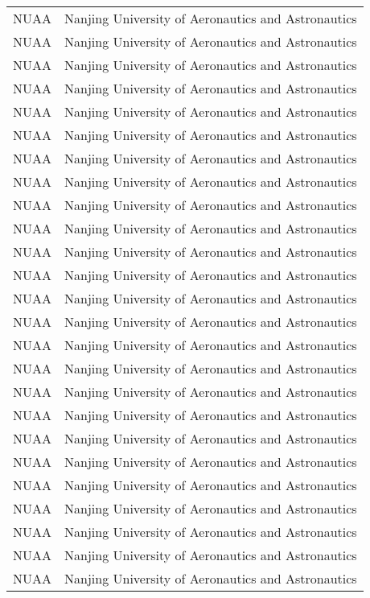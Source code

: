 \begin{longtable}{>{\centering\arraybackslash}p{3cm}>{\centering\arraybackslash}X}
		NUAA	& Nanjing University of Aeronautics and Astronautics \\ 
		NUAA	& Nanjing University of Aeronautics and Astronautics \\
		NUAA	& Nanjing University of Aeronautics and Astronautics \\ 
		NUAA	& Nanjing University of Aeronautics and Astronautics \\ 
		NUAA	& Nanjing University of Aeronautics and Astronautics \\ 
		NUAA	& Nanjing University of Aeronautics and Astronautics \\ 
		NUAA	& Nanjing University of Aeronautics and Astronautics \\ 
		NUAA	& Nanjing University of Aeronautics and Astronautics \\ 
		NUAA	& Nanjing University of Aeronautics and Astronautics \\ 
		NUAA	& Nanjing University of Aeronautics and Astronautics \\ 
		NUAA	& Nanjing University of Aeronautics and Astronautics \\ 
		NUAA	& Nanjing University of Aeronautics and Astronautics \\ 
		NUAA	& Nanjing University of Aeronautics and Astronautics \\ 
		NUAA	& Nanjing University of Aeronautics and Astronautics \\ 
		NUAA	& Nanjing University of Aeronautics and Astronautics \\ 
		NUAA	& Nanjing University of Aeronautics and Astronautics \\ 
		NUAA	& Nanjing University of Aeronautics and Astronautics \\ 
		NUAA	& Nanjing University of Aeronautics and Astronautics \\ 
		NUAA	& Nanjing University of Aeronautics and Astronautics \\ 
		NUAA	& Nanjing University of Aeronautics and Astronautics \\ 
		NUAA	& Nanjing University of Aeronautics and Astronautics \\ 
		NUAA	& Nanjing University of Aeronautics and Astronautics \\ 
		NUAA	& Nanjing University of Aeronautics and Astronautics \\ 
		NUAA	& Nanjing University of Aeronautics and Astronautics \\ 
		NUAA	& Nanjing University of Aeronautics and Astronautics \\ 

\end{longtable}
